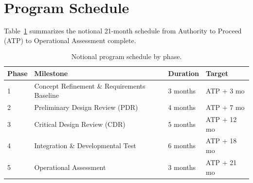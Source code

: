 \section{Program Schedule}

Table~\ref{tab:sched} summarizes the notional 21-month schedule from Authority to Proceed (ATP) to Operational Assessment complete.

\begin{table}[htbp]
\centering
\footnotesize
\begin{tabularx}{\linewidth}{@{}l >{\raggedright\arraybackslash}X l l@{}}
\toprule
\rowcolor{accentlight}
\textbf{Phase} & \textbf{Milestone} & \textbf{Duration} & \textbf{Target} \\
\midrule
1 & Concept Refinement \& Requirements Baseline & 3 months & ATP + 3 mo \\
2 & Preliminary Design Review (PDR) & 4 months & ATP + 7 mo \\
3 & Critical Design Review (CDR) & 5 months & ATP + 12 mo \\
4 & Integration \& Developmental Test & 6 months & ATP + 18 mo \\
5 & Operational Assessment & 3 months & ATP + 21 mo \\
\bottomrule
\end{tabularx}
\caption{Notional program schedule by phase.}
\label{tab:sched}
\end{table}

\clearpage

